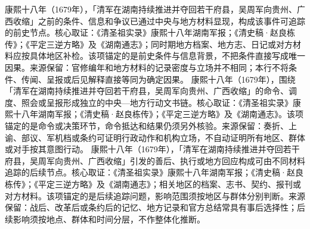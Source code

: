 康熙十八年（1679年），「清军在湖南持续推进并夺回若干府县，吴周军向贵州、广西收缩」之前的条件、信息和争议已通过中央与地方材料显现，构成该事件可追踪的前史节点。核心取证：《清圣祖实录》康熙十八年湖南军报；《清史稿·赵良栋传》；《平定三逆方略》及《湖南通志》；同时期地方档案、地方志、日记或对方材料应按具体地区补检。该项锚定的是前史条件与信息背景，不把条件直接写成唯一因果。来源保留：官修编年和地方材料的记录密度与立场并不相同；本行不将条件、传闻、呈报或后见解释直接等同为确定因果。
康熙十八年（1679年），围绕「清军在湖南持续推进并夺回若干府县，吴周军向贵州、广西收缩」的命令、调度、照会或呈报形成独立的中央—地方行动文书链。核心取证：《清圣祖实录》康熙十八年湖南军报；《清史稿·赵良栋传》；《平定三逆方略》及《湖南通志》。该项锚定的是命令或决策环节，命令抵达和结果仍须另外核验。来源保留：奏折、上谕、部议、军机档或条约可证明行政动作和机构立场，不自动证明所有地区、群体或对手按其意图行动。
康熙十八年（1679年），「清军在湖南持续推进并夺回若干府县，吴周军向贵州、广西收缩」引发的善后、执行或地方回应构成可由不同材料追踪的后续节点。核心取证：《清圣祖实录》康熙十八年湖南军报；《清史稿·赵良栋传》；《平定三逆方略》及《湖南通志》；相关地区的档案、志书、契约、报刊或对方材料。该项锚定的是后续追踪问题，影响范围须按地区与群体分别判断。来源保留：战后、改革后或条约后的记忆、地方记录和官方总结常具有事后选择性；后续影响须按地点、群体和时间分层，不作整体化推断。
